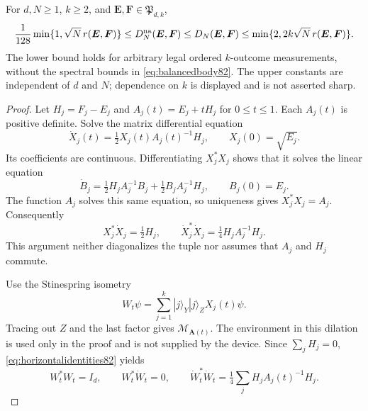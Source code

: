 \begin{theorem}
\label{thm:multioutcomemetric82}
For $d,N\ge1$, $k\ge2$, and
$\boldsymbol E,\boldsymbol F\in\mathfrak P_{d,k}$,
\begin{equation}\label{eq:multimetric82}
 \frac1{128}\min\{1,\sqrt N\,r(\boldsymbol E,\boldsymbol F)\}
 \le D_N^{\rm na}(\boldsymbol E,\boldsymbol F)
 \le D_N(\boldsymbol E,\boldsymbol F)
 \le\min\{2,2k\sqrt N\,r(\boldsymbol E,\boldsymbol F)\}.
\end{equation}
The lower bound holds for arbitrary legal ordered $k$-outcome
measurements, without the spectral bounds in
\eqref{eq:balancedbody82}.  The upper constants are independent of
$d$ and $N$; dependence on $k$ is displayed and is not asserted sharp.
\end{theorem}
\begin{proof}
Let $H_j=F_j-E_j$ and $A_j(t)=E_j+tH_j$ for $0\le t\le1$.
Each $A_j(t)$ is positive definite.  Solve the matrix differential
equation
\begin{equation}\label{eq:horizontalode82}
 \dot X_j(t)=\tfrac12 X_j(t)A_j(t)^{-1}H_j,
 \qquad X_j(0)=\sqrt{E_j}.
\end{equation}
Its coefficients are continuous.  Differentiating $X_j^*X_j$ shows
that it solves the linear equation
\[
 \dot B_j=\tfrac12 H_jA_j^{-1}B_j
             +\tfrac12 B_jA_j^{-1}H_j,\qquad B_j(0)=E_j.
\]
The function $A_j$ solves this same equation, so uniqueness gives
$X_j^*X_j=A_j$.  Consequently
\begin{equation}\label{eq:horizontalidentities82}
 X_j^*\dot X_j=\tfrac12 H_j,\qquad
 \dot X_j^*\dot X_j=\tfrac14 H_jA_j^{-1}H_j.
\end{equation}
This argument neither diagonalizes the tuple nor assumes that $A_j$
and $H_j$ commute.

Use the Stinespring isometry
\[
 W_t\psi=\sum_{j=1}^k |j\rangle_Y|j\rangle_Z X_j(t)\psi.
\]
Tracing out $Z$ and the last factor gives
$\mathcal M_{\boldsymbol A(t)}$.  The environment in this dilation
is used only in the proof and is not supplied by the device.  Since
$\sum_jH_j=0$, \eqref{eq:horizontalidentities82} yields
\begin{equation}\label{eq:horizontalzero82}
 W_t^*W_t=I_d,\qquad W_t^*\dot W_t=0,\qquad
 \dot W_t^*\dot W_t=\tfrac14\sum_jH_jA_j(t)^{-1}H_j.
\end{equation}


\end{proof}
